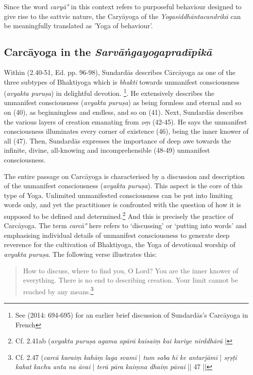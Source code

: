  Since the word \textit{caryā°} in this context refers to purposeful behaviour designed to give rise to the sattvic nature, the Caryāyoga of the \textit{Yogasiddhāntacandrikā} can be meaningfully translated as 'Yoga of behaviour'.  

\subsection{Carcāyoga in the \textit{Sarvāṅgayogapradīpikā}}

Within  (2.40-51, Ed. pp. 96-98), Sundardās describes Cārcāyoga as one of the three subtypes of Bhaktiyoga which is \textit{bhakti} towards unmanifest consciousness (\textit{avyakta puruṣa}) in delightful devotion. \footnote{See \citeauthor{burger2014sarvangayogapradipika} (2014: 694-695) for an earlier brief discussion of Sundardās's Carcāyoga in French}. He extensively describes the unmanifest consciousness (\textit{avyakta puruṣa}) as being formless and eternal and so on (40), as beginningless and endless, and so on (41). Next, Sundardās describes the various layers of creation emanating from \textit{oṃ} (42-45). He says the unmanifest consciousness illuminates every corner of existence (46), being the inner knower of all (47). Then, Sundardās expresses the importance of deep awe towards the infinite, divine, all-knowing and incomprehensible (48-49) unmanifest consciousness.

The entire passage on Carcāyoga is characterised by a discussion and description of the unmanifest consciousness (\textit{avyakta puruṣa}). This aspect is the core of this type of Yoga. Unlimited unmanifested consciousness can be put into limiting words only, and yet the practitioner is confronted with the question of how it is supposed to be defined and determined.\footnote{Cf.  2.41ab (\textit{avyakta puruṣa agama apārā} \textit{kaisaiṃ kai kariye nirddhārā} |} And this is precisely the practice of Carcāyoga. The term \textit{carcā°} here refers to `discussing' or `putting into words' and emphasising individual details of unmanifest consciousness to generate deep reverence for the cultivation of Bhaktiyoga, the Yoga of devotional worship of \textit{avyakta puruṣa}. The following verse illustrates this:
\begin{quote}
How to discuss, where to find you, O Lord? You are the inner knower of everything. There is no end to describing creation. Your limit cannot be reached by any means.\footnote{Cf.  2.47 (\textit{carcā karaiṃ kahāṃ laga svamī} | \textit{tum saba hī ke antarjāmī} | \textit{sṛṣṭi kahat kachu anta na āvai} | \textit{terā pāra kaiṃna dhaiṃ pāvai} || 47 ||} \end{quote}

